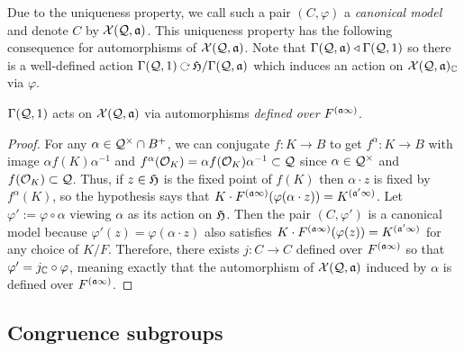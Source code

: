 \documentclass[main.tex]{subfiles}
\begin{document}
Due to the uniqueness property, we call such a pair $(C, \varphi)$ a \textit{canonical model} and denote $C$ by $\X(\cQ, \aa)$. This uniqueness property has the following consequence for automorphisms of $\X(\cQ, \aa)$. Note that $\Gamma(\cQ, \aa) \triangleleft \Gamma(\cQ, 1)$ so there is a well-defined action $\Gamma(\cQ, 1) \acts \frH/\Gamma(\cQ, \aa)$ which induces an action on $\X(\cQ, \aa)_{\CC}$ via $\varphi$.

\begin{lemma} \label{lem:automorphisms_defined_over_reflex}
$\Gamma(\cQ, 1)$ acts on $\X(\cQ, \aa)$ via automorphisms \textit{defined over} $F^{(\aa \infty)}$.
\end{lemma}

\begin{proof}
For any $\alpha \in \cQ^\times \cap B^+$, we can conjugate $f : K \to B$ to get $f^{\alpha} : K \to B$ with image $\alpha f(K) \alpha^{-1}$ and $f^{\alpha}(\cO_K) = \alpha f(\cO_K) \alpha^{-1} \subset \cQ$ since $\alpha \in \cQ^\times$ and $f(\cO_K) \subset \cQ$. Thus, if $z \in \frH$ is the fixed point of $f(K)$ then $\alpha \cdot z$ is fixed by $f^{\alpha}(K)$, so the hypothesis says that $K \cdot F^{(\aa \infty)}(\varphi(\alpha \cdot z)) = K^{(\aa' \infty)}$. Let $\varphi' := \varphi \circ \alpha$ viewing $\alpha$ as its action on $\frH$. Then the pair $(C, \varphi')$ is a canonical model because $\varphi'(z) = \varphi(\alpha \cdot z)$ also satisfies $K \cdot F^{(\aa \infty)}(\varphi(z)) = K^{(\aa' \infty)}$ for any choice of $K/F$. Therefore, there exists $j : C \to C$ defined over $F^{(\aa \infty)}$ so that $\varphi' = j_{\CC} \circ \varphi$, meaning exactly that the automorphism of $\X(\cQ, \aa)$ induced by $\alpha$ is defined over $F^{(\aa \infty)}$.
\end{proof}

\subsection{Congruence subgroups}
\end{document}
